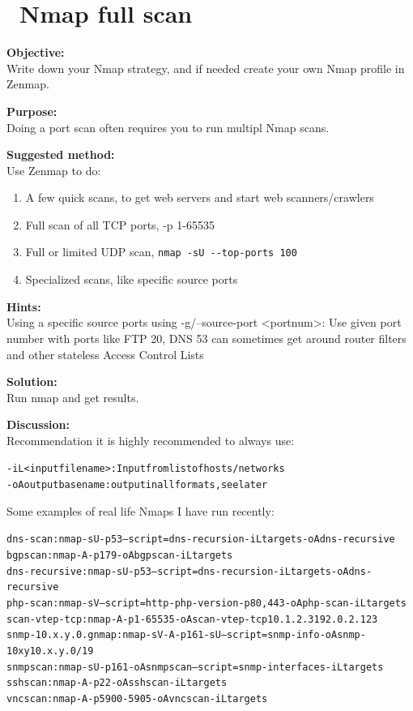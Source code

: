 \documentclass[a4paper,11pt,notitlepage]{report}
\begin{document}
\chapter{\faInfoCircle\ Nmap full scan}
\label{ex:nmap-strategy}


{\bf Objective:} \\
Write down your Nmap strategy, and if needed create your own Nmap profile in Zenmap.


{\bf Purpose:}\\
Doing a port scan often requires you to run multipl Nmap scans.


{\bf Suggested method:}\\
Use Zenmap to do:
\begin{enumerate}
\item A few quick scans, to get web servers and start web scanners/crawlers
\item Full scan of all TCP ports, -p 1-65535
\item Full or limited UDP scan, \verb+nmap -sU --top-ports 100+
\item Specialized scans, like specific source ports
\end{enumerate}


{\bf Hints:} \\
Using a specific source ports using -g/--source-port <portnum>: Use given port number with ports like FTP 20, DNS 53 can sometimes get around router filters and other stateless Access Control Lists

{\bf Solution:}\\
Run nmap and get results.

{\bf Discussion:}\\
Recommendation it is highly recommended to always use:
\begin{alltt}
-iL <inputfilename>: Input from list of hosts/networks
-oA outputbasename: output in all formats, see later
\end{alltt}

Some examples of real life Nmaps I have run recently:
\begin{alltt}
dns-scan: nmap -sU -p 53 --script=dns-recursion -iL targets -oA dns-recursive
bgpscan: nmap -A -p 179 -oA bgpscan -iL targets
dns-recursive: nmap -sU -p 53 --script=dns-recursion -iL targets -oA dns-recursive
php-scan: nmap -sV --script=http-php-version -p80,443 -oA php-scan -iL targets
scan-vtep-tcp: nmap -A -p 1-65535 -oA scan-vtep-tcp 10.1.2.3 192.0.2.123
snmp-10.x.y.0.gnmap: nmap -sV -A -p 161 -sU --script=snmp-info -oA snmp-10xy 10.x.y.0/19
snmpscan: nmap -sU -p 161 -oA snmpscan --script=snmp-interfaces -iL targets
sshscan: nmap -A -p 22 -oA sshscan -iL targets
vncscan: nmap -A -p 5900-5905 -oA vncscan -iL targets
\end{alltt}
\end{document}
